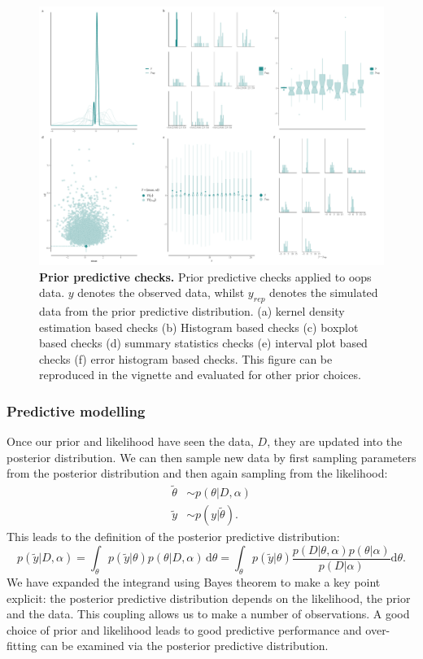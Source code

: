 \documentclass[12pt,english, journal=jpr, layout=twocolumn]{article}
\begin{document}
\begin{figure}[h!]
	\centering
	\includegraphics[width =1\textwidth]{priorpredictvechecks1.pdf}
	\caption{\textbf{Prior predictive checks.} Prior predictive checks applied to oops data. $y$ denotes the observed data, whilst $y_{rep}$ denotes the simulated data from the prior predictive distribution. (a) kernel density estimation based checks (b) Histogram based checks (c) boxplot based checks (d) summary statistics checks (e) interval plot based checks (f) error histogram based checks. This figure can be reproduced in the vignette and evaluated for other prior choices.}
	\label{figure::figure2}
\end{figure}


\subsubsection{Predictive modelling}
Once our prior and likelihood have seen the data, $D$, they are updated into the posterior distribution. We can then sample new data by first sampling parameters from the posterior distribution and then again sampling from the likelihood:
\begin{equation}
	\begin{split}
		\tilde{\theta} &\sim p(\theta|D, \alpha) \\
		\tilde{y} & \sim p(y|\tilde{\theta}).
	\end{split}
\end{equation}  
This leads to the definition of the posterior predictive distribution:
\begin{equation}
	p(\tilde{y}|D, \alpha) = \int_{\theta} p(\tilde{y}|\theta)p(\theta|D, \alpha)\, \text{d}\theta = \int_{\theta}p(\tilde{y}|\theta) \frac{p(D|\theta, \alpha)p(\theta|\alpha)}{p(D|\alpha)} \text{d}\theta.
\end{equation}
We have expanded the integrand using Bayes theorem to make a key point explicit: the posterior predictive distribution depends on the likelihood, the prior and the data. This coupling allows us to make a number of observations. A good choice of prior and likelihood leads to good predictive performance and over-fitting can be examined via the posterior predictive distribution. 
\end{document}

